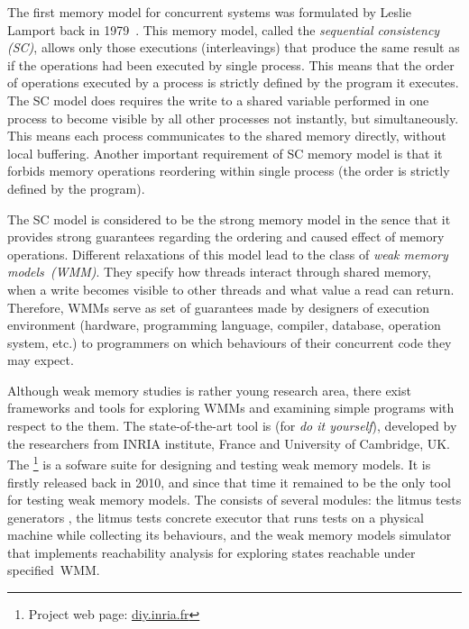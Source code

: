 
The first memory model for concurrent systems was formulated by Leslie Lamport back in 1979~\cite{lamport1979make}. This memory model, called the \textit{sequential consistency (SC)}, allows only those executions (interleavings) that produce the same result as if the operations had been executed by single process. This means that the order of operations executed by a process is strictly defined by the program it executes. The SC model does requires the write to a shared variable performed in one process to become visible by all other processes not instantly, but simultaneously. This means each process communicates to the shared memory directly, without local buffering. Another important requirement of SC memory model is that it forbids memory operations reordering within single process (the order is strictly defined by the program).

The SC model is considered to be the strong memory model in the sence that it provides strong guarantees regarding the ordering and caused effect of memory operations. Different relaxations of this model lead to the class of \textit{weak memory models~(WMM)}.
They specify how threads interact through shared memory, when a write becomes visible to other threads and what value a read can return. 
Therefore, WMMs serve as set of guarantees made by designers of execution environment (hardware, programming language, compiler, database, operation system, etc.) to programmers on which behaviours of their concurrent code they may expect. 

Although weak memory studies is rather young research area, there exist frameworks and tools for exploring WMMs and examining simple programs with respect to the them. The state-of-the-art tool is  (for \textit{do it yourself}), developed by the researchers from INRIA institute, France and University of Cambridge, UK.
The \footnote{Project web page: \url{diy.inria.fr}} is a sofware suite for designing and testing weak memory models. It is firstly released back in 2010, and since that time it remained to be the only tool for testing weak memory models. The  consists of several modules: the litmus tests generators , the litmus tests concrete executor  that runs tests on a physical machine while collecting its behaviours, and the weak memory models simulator  that implements reachability analysis for exploring states reachable under specified~WMM.

